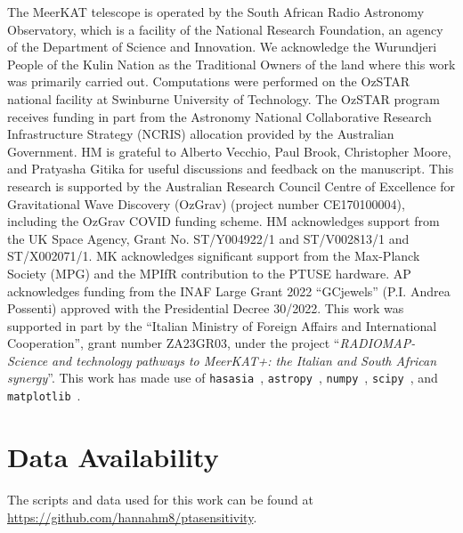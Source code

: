 \documentclass[fleqn,usenatbib]{mnras}
\begin{document}
The MeerKAT telescope is operated by the South African Radio Astronomy Observatory, which is a facility of the National Research Foundation, an agency of the Department of Science and Innovation.
We acknowledge the Wurundjeri People of the Kulin Nation as the Traditional Owners of the land where this work was primarily carried out. 
Computations were performed on the OzSTAR national facility at Swinburne University of Technology. The OzSTAR program receives funding in part from the Astronomy National Collaborative Research Infrastructure Strategy (NCRIS) allocation provided by the Australian Government. 
HM is grateful to Alberto Vecchio, Paul Brook, Christopher Moore, and Pratyasha Gitika for useful discussions and feedback on the manuscript.
This research is supported by the Australian Research Council Centre of Excellence for Gravitational Wave Discovery (OzGrav) (project number  CE170100004), including the OzGrav COVID funding scheme.
HM acknowledges support from the UK Space Agency, Grant No. ST/Y004922/1 and ST/V002813/1 and ST/X002071/1.
MK acknowledges significant support from the Max-Planck Society (MPG) and the MPIfR contribution to the PTUSE hardware.
AP acknowledges funding from the INAF Large Grant 2022 ``GCjewels'' (P.I. Andrea Possenti) approved with the Presidential Decree 30/2022.
This work was supported in part by the ``Italian Ministry of Foreign Affairs and International Cooperation'', grant number ZA23GR03, under the project ``\emph{RADIOMAP- Science and technology pathways to MeerKAT+: the Italian and South African synergy}''.
This work has made use of 
\texttt{hasasia}~\citep{Hazboun2019Hasasia},
\texttt{astropy}~\citep{astropy:2018},
\texttt{numpy}~\citep{numpyHarris2020array},
\texttt{scipy}~\citep{scipy2020SciPy-NMeth},
and \texttt{matplotlib}~\citep{matplotlibHunter:2007}.


\section*{Data Availability}
The scripts and data used for this work can be found at \url{https://github.com/hannahm8/ptasensitivity}. 


 




\bsp	%
\label{lastpage}
\end{document}
